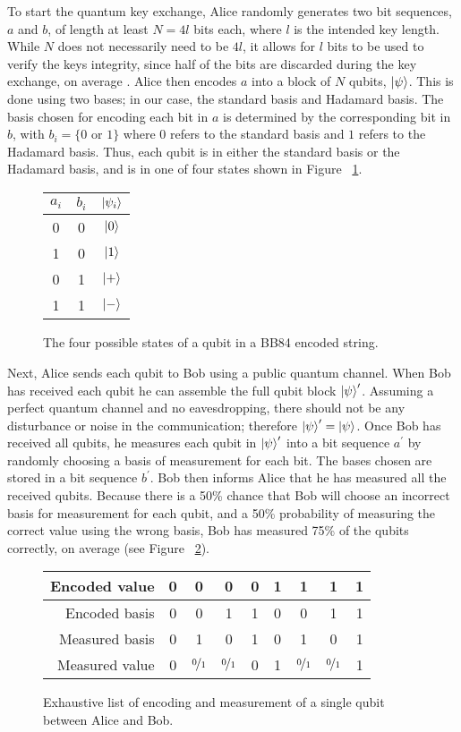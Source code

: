To start the quantum key exchange, Alice randomly generates two bit sequences, $a$ and $b$, of length at least $N = 4l$ bits each, where $l$ is the intended key length.
While $N$ does not necessarily need to be $4l$, it allows for $l$ bits to be used to verify the keys integrity, since half of the bits are discarded during the key exchange, on average \cite{MikeAndIke}.
Alice then encodes $a$ into a block of $N$ qubits, $\ket{\psi}$.
This is done using two bases; in our case, the standard basis and Hadamard basis.
The basis chosen for encoding each bit in $a$ is determined by the corresponding bit in $b$, with $b_i = \{0 \textrm{ or } 1\}$ where $0$ refers to the standard basis and $1$  refers to the Hadamard basis.
Thus, each qubit is in either the standard basis or the Hadamard basis, and is in one of four states shown in Figure ~\ref{fig:possible_states}.
\begin{figure}[htp]
\centering
\begin{tabular}{|c|c|c|}
\hline
$a_i$ & $b_i$ & $\ket{\psi_i}$ \\ \hline
0 & 0 & $\ket{0}$ \\ \hline
1 & 0 & $\ket{1}$ \\ \hline
0 & 1 & $\ket{+}$ \\ \hline
1 & 1 & $\ket{-}$ \\ \hline
\end{tabular}
\caption{The four possible states of a qubit in a BB84 encoded string.}
\label{fig:possible_states}
\end{figure}
Next, Alice sends each qubit to Bob using a public quantum channel.
When Bob has received each qubit he can assemble the full qubit block $\ket{\psi}^\prime$.
Assuming a perfect quantum channel and no eavesdropping, there should not be any disturbance or noise in the communication; therefore $\ket{\psi}^\prime = \ket{\psi}$.
Once Bob has received all qubits, he measures each qubit in $\ket{\psi}^\prime$ into a bit sequence $a^\prime$ by randomly choosing a basis of measurement for each bit.
The bases chosen are stored in a bit sequence $b^\prime$.
Bob then informs Alice that he has measured all the received qubits.
Because there is a 50\% chance that Bob will choose an incorrect basis for measurement for each qubit, and a 50\% probability of measuring the correct value using the wrong basis, Bob has measured 75\% of the qubits correctly, on average (see Figure ~\ref{fig:possible_measurements_no_eve}).
\begin{figure}[htp]
	\centering
	\begin{tabular}{|r|c|c|c|c|c|c|c|c|}
		\hline
		Encoded value  & 0 & 0 & 0 & 0 & 1 & 1 & 1 & 1 \\ \hline
		Encoded basis  & 0 & 0 & 1 & 1 & 0 & 0 & 1 & 1 \\ \hline
		Measured basis  & 0 & 1 & 0 & 1 & 0 & 1 & 0 & 1 \\ \hline
		Measured value & 0 & $\nicefrac{0}{1}$& $\nicefrac{0}{1}$ & 0 & 1 & $\nicefrac{0}{1}$ & $\nicefrac{0}{1}$ & 1\\
		\hline
	\end{tabular}
	\caption{Exhaustive list of encoding and measurement of a single qubit between Alice and Bob.}
	\label{fig:possible_measurements_no_eve}
\end{figure}
